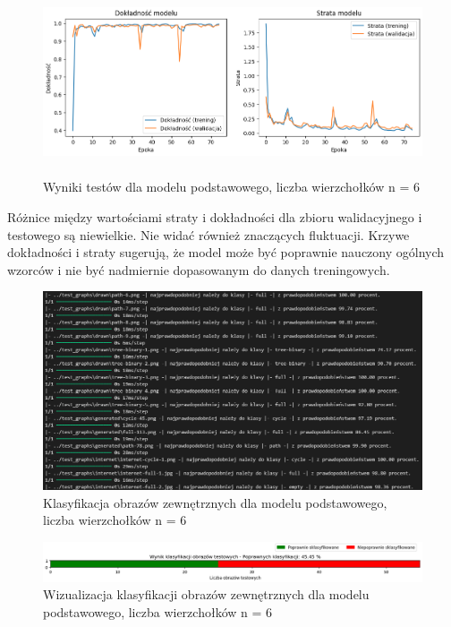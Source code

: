 \begin{figure}[ht]
	\centering
	\includegraphics[height=5.5cm]{resources/tests/images/v3/base6_img.png}
	\caption{Wyniki testów dla modelu podstawowego, liczba wierzchołków n = 6}
	\label{Fig:tests-base-3a}
\end{figure}
\FloatBarrier

Różnice między wartościami straty i dokładności dla zbioru walidacyjnego i testowego są niewielkie.
Nie widać również znaczących fluktuacji.
Krzywe dokładności i straty sugerują, że model może być poprawnie nauczony ogólnych wzorców
i nie być nadmiernie dopasowanym do danych treningowych.

\begin{figure}[ht]
	\centering
	\includegraphics[width=14cm]{resources/tests/images/v3/base6_txt.png}
	\caption{Klasyfikacja obrazów zewnętrznych dla modelu podstawowego, liczba wierzchołków n = 6}
	\label{Fig:tests-base-3b}
\end{figure}
\FloatBarrier

\begin{figure}[ht]
	\centering
	\includegraphics[width=14cm]{resources/tests/images/v3/base6_bar.png}
	\caption{Wizualizacja klasyfikacji obrazów zewnętrznych dla modelu podstawowego, liczba wierzchołków n = 6}
	\label{Fig:tests-base-3c}
\end{figure}
\FloatBarrier

